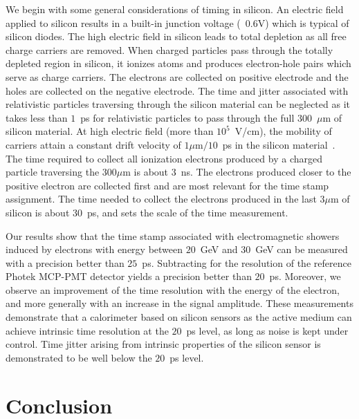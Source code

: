 \documentclass[12pt]{article}
\begin{document}
{We begin with some general considerations of timing in silicon.
An electric field applied to silicon results in a built-in junction voltage
(~0.6V) which is typical of silicon diodes. The high electric field in silicon
leads to total depletion as all free charge carriers are removed. 
When charged particles pass through the totally depleted region in silicon, 
it ionizes atoms and produces electron-hole pairs which serve as charge carriers.
The electrons are collected on positive electrode and the holes are collected
on the negative electrode. The time and jitter associated with relativistic particles 
traversing through the silicon material can be neglected as it takes 
less than $1$~ps for relativistic particles to pass through the full $300$~$\mu$m
of silicon material. At high electric field (more than $10^{5}$~V/cm), the mobility 
of carriers attain a constant drift velocity of $1\mu$m$/10$~ps in the silicon 
material~\cite{Ronzhin2015,spieler2005semiconductor}. The time required to collect all ionization electrons
produced by a charged particle traversing the $300\mu$m is about $3$~ns.
The electrons produced closer to the positive electron are collected first and are
most relevant for the time stamp assignment. The time needed to collect the electrons
produced in the last $3\mu$m of silicon is about $30$~ps, and sets the scale
of the time measurement.

Our results show that the time stamp associated with electromagnetic 
showers induced by electrons with energy between $20$~GeV and $30$~GeV 
can be measured with a precision better than $25$~ps. Subtracting for the resolution
of the reference Photek MCP-PMT detector yields a precision better than $20$~ps. 
Moreover, we observe an improvement of the time resolution with the energy of 
the electron, and more generally with an increase in the signal amplitude. 
These measurements demonstrate that a calorimeter based on silicon sensors as
the active medium can achieve intrinsic time resolution at the $20$~ps level, as long
as noise is kept under control. Time jitter arising from intrinsic properties of the
silicon sensor is demonstrated to be well below the $20$~ps level.

\section{Conclusion}
\label{sec:conclusion} 

}
\end{document}
